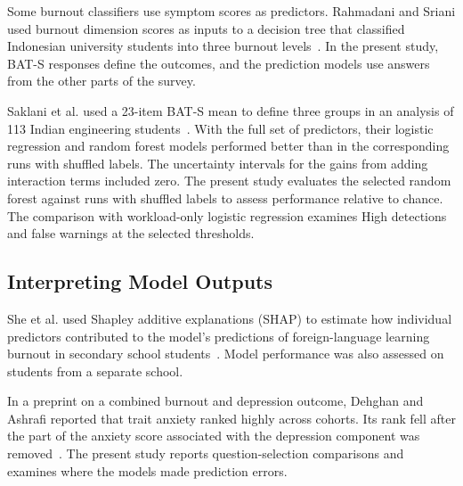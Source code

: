 Some burnout classifiers use symptom scores as predictors. Rahmadani and Sriani used burnout dimension scores as inputs to a decision tree that classified Indonesian university students into three burnout levels~\cite{rahmadani2026burnout}. In the present study, BAT-S responses define the outcomes, and the prediction models use answers from the other parts of the survey.

Saklani et al. used a 23-item BAT-S mean to define three groups in an analysis of 113 Indian engineering students~\cite{saklani2026burnout}. With the full set of predictors, their logistic regression and random forest models performed better than in the corresponding runs with shuffled labels. The uncertainty intervals for the gains from adding interaction terms included zero. The present study evaluates the selected random forest against runs with shuffled labels to assess performance relative to chance. The comparison with workload-only logistic regression examines High detections and false warnings at the selected thresholds.

\subsection{Interpreting Model Outputs}

She et al. used Shapley additive explanations (SHAP) to estimate how individual predictors contributed to the model's predictions of foreign-language learning burnout in secondary school students~\cite{she2026languageburnout}. Model performance was also assessed on students from a separate school.

In a preprint on a combined burnout and depression outcome, Dehghan and Ashrafi reported that trait anxiety ranked highly across cohorts. Its rank fell after the part of the anxiety score associated with the depression component was removed~\cite{dehghan2026overlap}. The present study reports question-selection comparisons and examines where the models made prediction errors.
